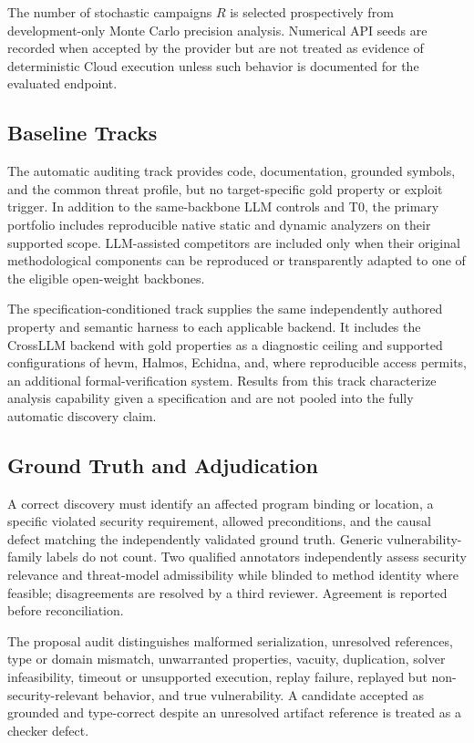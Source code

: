 \documentclass[journal]{IEEEtran}
\theoremstyle{definition}
\begin{document}
The number of stochastic campaigns $R$ is selected prospectively from development-only Monte Carlo precision analysis. Numerical API seeds are recorded when accepted by the provider but are not treated as evidence of deterministic Cloud execution unless such behavior is documented for the evaluated endpoint.

\subsection{Baseline Tracks}
The automatic auditing track provides code, documentation, grounded symbols, and the common threat profile, but no target-specific gold property or exploit trigger. In addition to the same-backbone LLM controls and T0, the primary portfolio includes reproducible native static and dynamic analyzers on their supported scope. LLM-assisted competitors are included only when their original methodological components can be reproduced or transparently adapted to one of the eligible open-weight backbones.

The specification-conditioned track supplies the same independently authored property and semantic harness to each applicable backend. It includes the CrossLLM backend with gold properties as a diagnostic ceiling and supported configurations of hevm, Halmos, Echidna, and, where reproducible access permits, an additional formal-verification system. Results from this track characterize analysis capability given a specification and are not pooled into the fully automatic discovery claim.

\subsection{Ground Truth and Adjudication}
A correct discovery must identify an affected program binding or location, a specific violated security requirement, allowed preconditions, and the causal defect matching the independently validated ground truth. Generic vulnerability-family labels do not count. Two qualified annotators independently assess security relevance and threat-model admissibility while blinded to method identity where feasible; disagreements are resolved by a third reviewer. Agreement is reported before reconciliation.

The proposal audit distinguishes malformed serialization, unresolved references, type or domain mismatch, unwarranted properties, vacuity, duplication, solver infeasibility, timeout or unsupported execution, replay failure, replayed but non-security-relevant behavior, and true vulnerability. A candidate accepted as grounded and type-correct despite an unresolved artifact reference is treated as a checker defect.
\end{document}
